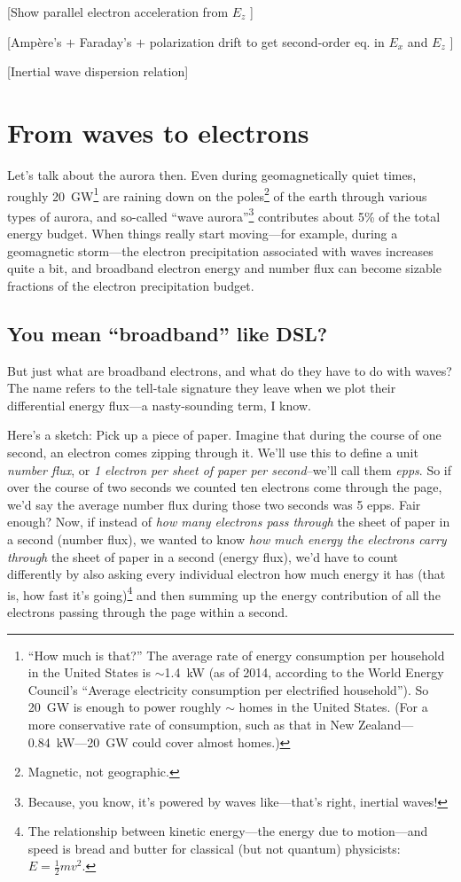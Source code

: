   [Show parallel
electron acceleration from $E_z$ ]

[Amp\`{e}re's $+$ Faraday's $+$ polarization drift to get second-order eq. in $E_x$ and $E_z$ ]

[Inertial \Alf wave dispersion relation]

\section{From waves to electrons}

Let's talk about the aurora then. Even during geomagnetically quiet times,
roughly 20~GW\footnote{``How much is that?'' The average rate of energy
  consumption per household in the United States is $\sim$1.4~kW (as of 2014,
  according to the World Energy Council's ``Average electricity consumption per
  electrified household''). So 20~GW is enough to power roughly
  $\sim$ homes in the United States. (For a more conservative
  rate of consumption, such as that in New Zealand---0.84~kW---20~GW could cover
  almost  homes.)} \citep{Newell2009} are raining down on the
poles\footnote{Magnetic, not geographic.} of the earth through various types of
aurora, and so-called ``wave aurora''\footnote{Because, you know, it's powered
  by waves like---that's right, inertial \Alf waves!} contributes about 5\% of
the total energy budget. When things really start moving---for example, during a
geomagnetic storm---the electron precipitation associated with \Alf waves
increases quite a bit, and broadband electron energy and number flux can become
sizable fractions of the electron precipitation budget.

\subsection{You mean ``broadband'' like DSL?}

But just what are broadband electrons, and what do they have to do
with \Alf waves? The name refers to the tell-tale signature they leave
when we plot their differential energy flux---a nasty-sounding term, I
know.

Here's a sketch: Pick up a piece of paper. Imagine that during the
course of one second, an electron comes zipping through it. We'll use
this to define a unit \emph{number flux}, or \emph {1 electron per
  sheet of paper per second}--we'll call them \emph{epps}. So if over
the course of two seconds we counted ten electrons come through the
page, we'd say the average number flux during those two seconds was 5
epps. Fair enough?  Now, if instead of \emph{how many electrons pass
  through} the sheet of paper in a second (number flux), we wanted to
know \emph{how much energy the electrons carry through} the sheet of
paper in a second (energy flux), we'd have to count differently by
also asking every individual electron how much energy it has (that is,
how fast it's going)\footnote{The relationship between kinetic
  energy---the energy due to motion---and speed is bread and butter
  for classical (but not quantum) physicists: $E = \frac{1}{2}m v^2.$}
and then summing up the energy contribution of all the electrons
passing through the page within a second.

